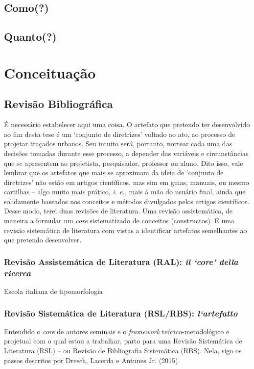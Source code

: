 \documentclass[]{report}
\begin{document}
\section{Como(?)}

\section{Quanto(?)}



	\chapter{Conceituação}

			\section{Revisão Bibliográfica}

			É necessário estabelecer aqui uma coisa. O artefato que pretendo ter desenvolvido ao fim desta tese é um `conjunto de diretrizes' voltado ao ato, ao processo de projetar traçados urbanos. Seu intuito será, portanto, nortear cada uma das decisões tomadas durante esse processo, a depender das variáveis e circunstâncias que se apresentem ao projetista, pesquisador, professor ou aluno. Dito isso, vale lembrar que os artefatos que mais se aproximam da ideia de `conjunto de diretrizes' não estão em artigos científicos, mas sim em guias, manuais, ou mesmo cartilhas – algo muito mais prático, \textit{i. e.,} mais à mão do usuário final, ainda que solidamente baseados nos conceitos e métodos divulgados pelos artigos científicos. Desse modo, terei duas revisões de literatura. Uma revisão assistemática, de maneira a formular um \textit{core} sistematizado de conceitos (constructos). E uma revisão sistemática de literatura com vistas a identificar artefatos semelhantes ao que pretendo desenvolver.

				\subsection{Revisão Assistemática de Literatura (RAL): \textit{il `core' della ricerca}}

				Escola italiana de tipomorfologia

				\subsection{Revisão Sistemática de Literatura (RSL/RBS): \textit{l`artefatto}}
				Entendido o \textit{core} de autores seminais e o \textit{framework} teórico-metodológico e projetual com o qual estou a trabalhar, parto para uma Revisão Sistemática de Literatura (RSL) – ou Revisão de Bibliografia Sistemática (RBS). Nela, sigo os passos descritos por Dresch, Lacerda e Antunes Jr. (2015).
\end{document}
